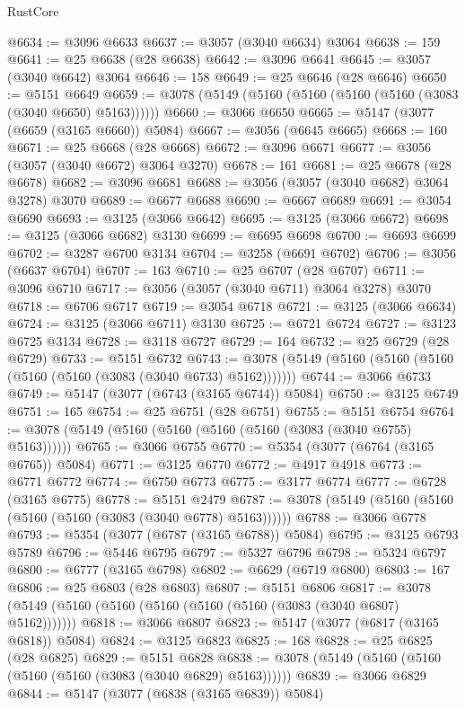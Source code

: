\begin{lexlean}{RustCore}
\begin{coremodule}
@6634 := @3096 @6633
@6637 := @3057 (@3040 @6634) @3064
@6638 := 159
@6641 := @25 @6638 (@28 @6638)
@6642 := @3096 @6641
@6645 := @3057 (@3040 @6642) @3064
@6646 := 158
@6649 := @25 @6646 (@28 @6646)
@6650 := @5151 @6649
@6659 := @3078 (@5149 (@5160 (@5160 (@5160 (@5160 (@3083 (@3040 @6650) @5163))))))
@6660 := @3066 @6650
@6665 := @5147 (@3077 (@6659 (@3165 @6660)) @5084)
@6667 := @3056 (@6645 @6665)
@6668 := 160
@6671 := @25 @6668 (@28 @6668)
@6672 := @3096 @6671
@6677 := @3056 (@3057 (@3040 @6672) @3064 @3270)
@6678 := 161
@6681 := @25 @6678 (@28 @6678)
@6682 := @3096 @6681
@6688 := @3056 (@3057 (@3040 @6682) @3064 @3278) @3070
@6689 := @6677 @6688
@6690 := @6667 @6689
@6691 := @3054 @6690
@6693 := @3125 (@3066 @6642)
@6695 := @3125 (@3066 @6672)
@6698 := @3125 (@3066 @6682) @3130
@6699 := @6695 @6698
@6700 := @6693 @6699
@6702 := @3287 @6700 @3134
@6704 := @3258 (@6691 @6702)
@6706 := @3056 (@6637 @6704)
@6707 := 163
@6710 := @25 @6707 (@28 @6707)
@6711 := @3096 @6710
@6717 := @3056 (@3057 (@3040 @6711) @3064 @3278) @3070
@6718 := @6706 @6717
@6719 := @3054 @6718
@6721 := @3125 (@3066 @6634)
@6724 := @3125 (@3066 @6711) @3130
@6725 := @6721 @6724
@6727 := @3123 @6725 @3134
@6728 := @3118 @6727
@6729 := 164
@6732 := @25 @6729 (@28 @6729)
@6733 := @5151 @6732
@6743 := @3078 (@5149 (@5160 (@5160 (@5160 (@5160 (@5160 (@3083 (@3040 @6733) @5162)))))))
@6744 := @3066 @6733
@6749 := @5147 (@3077 (@6743 (@3165 @6744)) @5084)
@6750 := @3125 @6749
@6751 := 165
@6754 := @25 @6751 (@28 @6751)
@6755 := @5151 @6754
@6764 := @3078 (@5149 (@5160 (@5160 (@5160 (@5160 (@3083 (@3040 @6755) @5163))))))
@6765 := @3066 @6755
@6770 := @5354 (@3077 (@6764 (@3165 @6765)) @5084)
@6771 := @3125 @6770
@6772 := @4917 @4918
@6773 := @6771 @6772
@6774 := @6750 @6773
@6775 := @3177 @6774
@6777 := @6728 (@3165 @6775)
@6778 := @5151 @2479
@6787 := @3078 (@5149 (@5160 (@5160 (@5160 (@5160 (@3083 (@3040 @6778) @5163))))))
@6788 := @3066 @6778
@6793 := @5354 (@3077 (@6787 (@3165 @6788)) @5084)
@6795 := @3125 @6793 @5789
@6796 := @5446 @6795
@6797 := @5327 @6796
@6798 := @5324 @6797
@6800 := @6777 (@3165 @6798)
@6802 := @6629 (@6719 @6800)
@6803 := 167
@6806 := @25 @6803 (@28 @6803)
@6807 := @5151 @6806
@6817 := @3078 (@5149 (@5160 (@5160 (@5160 (@5160 (@5160 (@3083 (@3040 @6807) @5162)))))))
@6818 := @3066 @6807
@6823 := @5147 (@3077 (@6817 (@3165 @6818)) @5084)
@6824 := @3125 @6823
@6825 := 168
@6828 := @25 @6825 (@28 @6825)
@6829 := @5151 @6828
@6838 := @3078 (@5149 (@5160 (@5160 (@5160 (@5160 (@3083 (@3040 @6829) @5163))))))
@6839 := @3066 @6829
@6844 := @5147 (@3077 (@6838 (@3165 @6839)) @5084)

\end{coremodule}
\end{lexlean}
